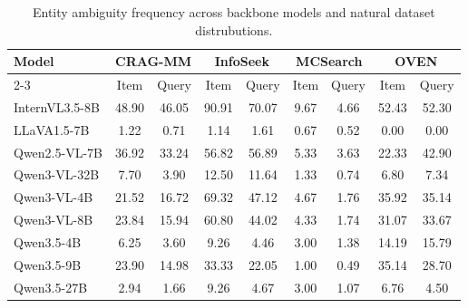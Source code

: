 \documentclass{article} %
\begin{document}
\begin{table}[htbp]
    \centering
    \setlength{\tabcolsep}{3pt}
    \caption{Entity ambiguity frequency across backbone models and natural dataset distrubutions.}
    \begin{tabular}{l c c c c c c c c}
    \hline
    \textbf{Model} & \multicolumn{2}{c}{\textbf{CRAG-MM}} & \multicolumn{2}{c}{\textbf{InfoSeek}} & \multicolumn{2}{c}{\textbf{MCSearch}} & \multicolumn{2}{c}{\textbf{OVEN}} \\
    \cline{2-3} \cline{4-5} \cline{6-7} \cline{8-9}
    & Item & Query & Item & Query & Item & Query & Item & Query \\
    \midrule
    InternVL3.5-8B & 48.90 & 46.05 & 90.91 & 70.07 & 9.67 & 4.66 & 52.43 & 52.30 \\
    LLaVA1.5-7B & 1.22 & 0.71 & 1.14 & 1.61 & 0.67 & 0.52 & 0.00 & 0.00 \\
    Qwen2.5-VL-7B & 36.92 & 33.24 & 56.82 & 56.89 & 5.33 & 3.63 & 22.33 & 42.90 \\
    Qwen3-VL-32B & 7.70 & 3.90 & 12.50 & 11.64 & 1.33 & 0.74 & 6.80 & 7.34 \\
    Qwen3-VL-4B & 21.52 & 16.72 & 69.32 & 47.12 & 4.67 & 1.76 & 35.92 & 35.14 \\
    Qwen3-VL-8B & 23.84 & 15.94 & 60.80 & 44.02 & 4.33 & 1.74 & 31.07 & 33.67 \\
    Qwen3.5-4B  & 6.25 & 3.60 & 9.26 & 4.46 & 3.00 & 1.38 & 14.19 & 15.79 \\
    Qwen3.5-9B  & 23.90 & 14.98 & 33.33 & 22.05 & 1.00 & 0.49 & 35.14 & 28.70 \\
    Qwen3.5-27B  & 2.94 & 1.66 & 9.26 & 4.67 & 3.00 & 1.07 & 6.76 & 4.50 \\
    \midrule
    \end{tabular}
    \label{tab:ambiguity_frequency_source}
\end{table}
\end{document}
